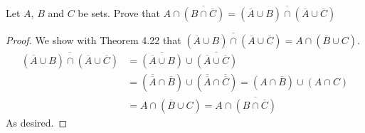 \documentclass[12pt]{article}
\newenvironment{problem}[2][Problem]{\begin{trivlist}
		\item[\hskip \labelsep {\bfseries #1}\hskip \labelsep {\bfseries #2.}]}{\end{trivlist}}
\begin{document}
	\begin{problem}{58}
		Let $A$, $B$ and $C$ be sets. Prove that $A\cap \overline{(B\cap \overline{C})} = \overline{(\overline{A}\cup B)\cap (\overline{A}\cup \overline{C})}$
		\begin{proof}
			We show with Theorem 4.22 that $\overline{(\overline{A}\cup B)\cap (\overline{A}\cup \overline{C})} = A\cap (\overline{B}\cup C)$.
			\begin{align*}
				\overline{(\overline{A}\cup B)\cap (\overline{A}\cup \overline{C})} &= \overline{(\overline{A}\cup B)}\cup \overline{(\overline{A}\cup \overline{C})}\\
				&=  (\overline{\overline{A}}\cap \overline{B})\cup (\overline{\overline{A}}\cap \overline{\overline{C}}) = (A\cap \overline{B})\cup (A\cap C)\\
				&= A\cap (\overline{B}\cup C) = A\cap \overline{(B\cap \overline{C})}
			\end{align*}
		As desired.
		\end{proof}
	\end{problem}
\end{document}
